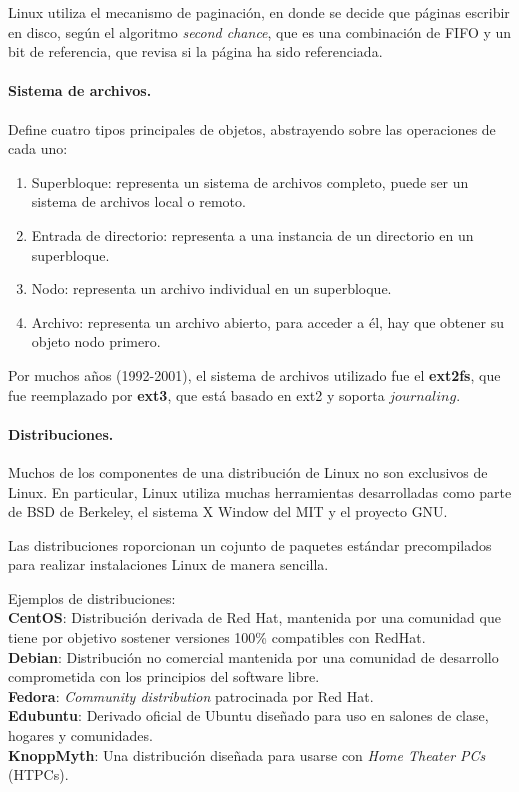 \documentclass[spanish]{article}
\begin{document}
Linux utiliza el mecanismo de paginación, en donde se decide que páginas escribir en disco, según el algoritmo \textit{second chance}, que es una combinación de FIFO y un bit de referencia, que revisa si la página ha sido referenciada.

\paragraph{Sistema de archivos.} Define cuatro tipos principales de objetos, abstrayendo sobre las operaciones de cada uno:
\begin{enumerate}
  \item Superbloque: representa un sistema de archivos completo, puede ser un sistema de archivos local o remoto.
  \item Entrada de directorio: representa a una instancia de un directorio en un superbloque.
  \item Nodo: representa un archivo individual en un superbloque.
  \item Archivo: representa un archivo abierto, para acceder a él, hay que obtener su objeto nodo primero.
\end{enumerate}

Por muchos años (1992-2001), el sistema de archivos utilizado fue el \textbf{ext2fs}, que fue reemplazado por \textbf{ext3}, que está basado en ext2 y soporta $journaling$.

\paragraph{Distribuciones.}
Muchos de los componentes de una distribución de Linux no son exclusivos de Linux. En particular, Linux utiliza muchas herramientas desarrolladas como parte de BSD de Berkeley, el sistema X Window del MIT y el proyecto GNU. 

Las distribuciones roporcionan un cojunto de paquetes estándar precompilados para realizar instalaciones Linux de manera sencilla.

Ejemplos de distribuciones:\\
\textbf{CentOS}: Distribución derivada de Red Hat, mantenida por una comunidad que tiene por objetivo sostener versiones 100\% compatibles con RedHat. \\\textbf{Debian}: Distribución no comercial mantenida por una comunidad de desarrollo comprometida con los principios del software libre. \\ \textbf{Fedora}: \textit{Community distribution} patrocinada por Red Hat. \\ \textbf{Edubuntu}: Derivado oficial de Ubuntu diseñado para uso en salones de clase, hogares y comunidades.\\ \textbf{KnoppMyth}: Una distribución diseñada para usarse con \textit{Home Theater PCs} (HTPCs). 
\end{document}
